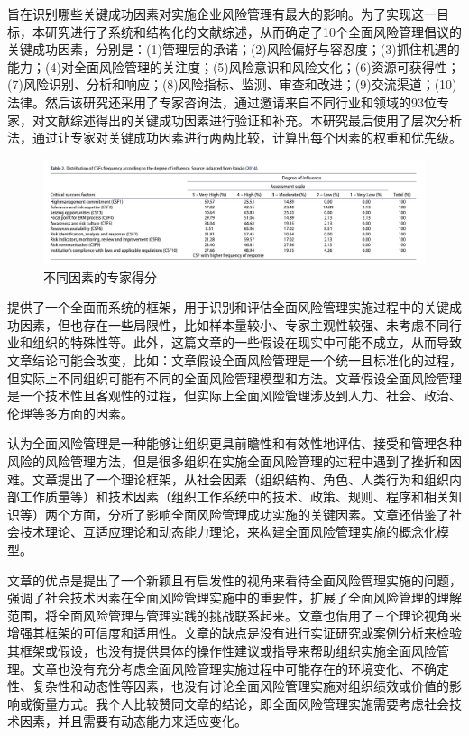 \documentclass[a4paper,12pt]{ctexart}
\begin{document}
\citet{oliveira2019critical}旨在识别哪些关键成功因素对实施企业风险管理有最大的影响。为了实现这一目标，本研究进行了系统和结构化的文献综述，从而确定了10个全面风险管理倡议的关键成功因素，分别是：(1)管理层的承诺；(2)风险偏好与容忍度；(3)抓住机遇的能力；(4)对全面风险管理的关注度；(5)风险意识和风险文化；(6)资源可获得性；(7)风险识别、分析和响应；(8)风险指标、监测、审查和改进；(9)交流渠道；(10)法律。然后该研究还采用了专家咨询法，通过邀请来自不同行业和领域的93位专家，对文献综述得出的关键成功因素进行验证和补充。本研究最后使用了层次分析法，通过让专家对关键成功因素进行两两比较，计算出每个因素的权重和优先级。
\begin{figure}[H]
    \caption{不同因素的专家得分}
    \centering
    \includegraphics[width=\linewidth]{img/olivia.png}
\end{figure}

\citet{oliveira2019critical}提供了一个全面而系统的框架，用于识别和评估全面风险管理实施过程中的关键成功因素，但也存在一些局限性，比如样本量较小、专家主观性较强、未考虑不同行业和组织的特殊性等。此外，这篇文章的一些假设在现实中可能不成立，从而导致文章结论可能会改变，比如：文章假设全面风险管理是一个统一且标准化的过程，但实际上不同组织可能有不同的全面风险管理模型和方法。文章假设全面风险管理是一个技术性且客观性的过程，但实际上全面风险管理涉及到人力、社会、政治、伦理等多方面的因素。

\citet{jean2021rethinking}认为全面风险管理是一种能够让组织更具前瞻性和有效性地评估、接受和管理各种风险的风险管理方法，但是很多组织在实施全面风险管理的过程中遇到了挫折和困难。文章提出了一个理论框架，从社会因素（组织结构、角色、人类行为和组织内部工作质量等）和技术因素（组织工作系统中的技术、政策、规则、程序和相关知识等）两个方面，分析了影响全面风险管理成功实施的关键因素。文章还借鉴了社会技术理论、互适应理论和动态能力理论，来构建全面风险管理实施的概念化模型。

\citet{jean2021rethinking}文章的优点是提出了一个新颖且有启发性的视角来看待全面风险管理实施的问题，强调了社会技术因素在全面风险管理实施中的重要性，扩展了全面风险管理的理解范围，将全面风险管理与管理实践的挑战联系起来。文章也借用了三个理论视角来增强其框架的可信度和适用性。文章的缺点是没有进行实证研究或案例分析来检验其框架或假设，也没有提供具体的操作性建议或指导来帮助组织实施全面风险管理。文章也没有充分考虑全面风险管理实施过程中可能存在的环境变化、不确定性、复杂性和动态性等因素，也没有讨论全面风险管理实施对组织绩效或价值的影响或衡量方式。我个人比较赞同文章的结论，即全面风险管理实施需要考虑社会技术因素，并且需要有动态能力来适应变化。
\end{document}
